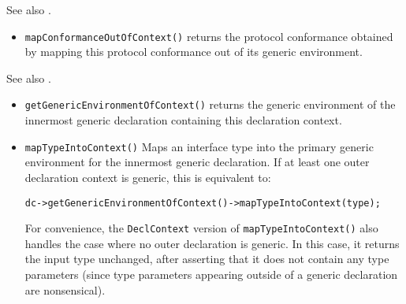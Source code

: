 \documentclass[../generics]{subfiles}
\begin{document}
See also .
\begin{itemize}
\item \texttt{mapConformanceOutOfContext()} returns the protocol conformance obtained by mapping this protocol conformance out of its generic environment.
\end{itemize}

See also .
\begin{itemize}
\item \texttt{getGenericEnvironmentOfContext()} returns the generic environment of the innermost generic declaration containing this declaration context.
\item \texttt{mapTypeIntoContext()} Maps an interface type into the primary generic environment for the innermost generic declaration. If at least one outer declaration context is generic, this is equivalent to:
\begin{Verbatim}
dc->getGenericEnvironmentOfContext()->mapTypeIntoContext(type);
\end{Verbatim}
For convenience, the \texttt{DeclContext} version of \texttt{mapTypeIntoContext()} also handles the case where no outer declaration is generic. In this case, it returns the input type unchanged, after asserting that it does not contain any type parameters (since type parameters appearing outside of a generic declaration are nonsensical).
\end{itemize}
\end{document}
